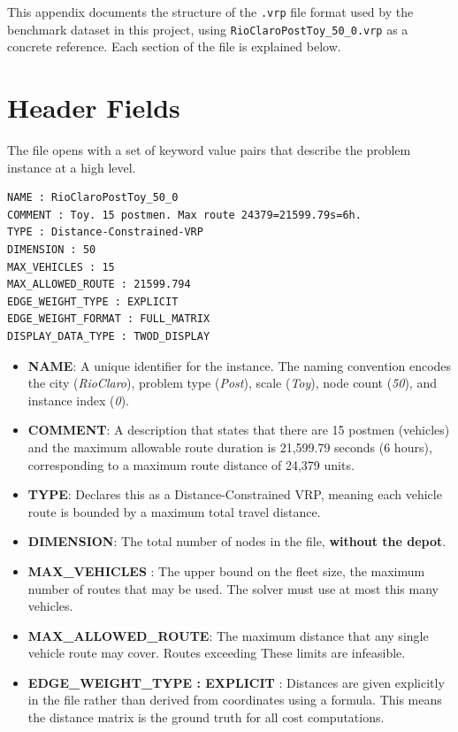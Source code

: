 \documentclass[a4paper]{report}
\begin{document}
{\begin{itemize}
\begin{itemize}
\begin{appendices}
This appendix documents the structure of the \texttt{.vrp} file format used by the
benchmark dataset in this project, using \texttt{RioClaroPostToy\_50\_0.vrp} as a
concrete reference. Each section of the file is explained below.
\section*{Header Fields}
The file opens with a set of keyword value pairs that describe the problem instance
at a high level.
\begin{verbatim}
NAME : RioClaroPostToy_50_0
COMMENT : Toy. 15 postmen. Max route 24379=21599.79s=6h.
TYPE : Distance-Constrained-VRP
DIMENSION : 50
MAX_VEHICLES : 15
MAX_ALLOWED_ROUTE : 21599.794
EDGE_WEIGHT_TYPE : EXPLICIT
EDGE_WEIGHT_FORMAT : FULL_MATRIX
DISPLAY_DATA_TYPE : TWOD_DISPLAY
\end{verbatim}
\begin{itemize}
    \item \textbf{NAME}: A unique identifier for the instance. The naming convention
    encodes the city (\textit{RioClaro}), problem type (\textit{Post}), scale
    (\textit{Toy}), node count (\textit{50}), and instance index (\textit{0}).

    \item \textbf{COMMENT}: A description that states that there are
    15 postmen (vehicles) and the maximum allowable route duration is 21,599.79
    seconds (6 hours), corresponding to a maximum route distance of 24,379 units.

    \item \textbf{TYPE}:  Declares this as a Distance-Constrained VRP, meaning each
    vehicle route is bounded by a maximum total travel distance.

    \item \textbf{DIMENSION}: The total number of nodes in the file, \textbf{without the depot}.
    \item \textbf{MAX\_VEHICLES} : The upper bound on the fleet size, the
    maximum number of routes that may be used. The solver must use at most this
    many vehicles.

    \item \textbf{MAX\_ALLOWED\_ROUTE}: The maximum distance that any single vehicle route may cover. Routes exceeding
    These limits are infeasible.

    \item \textbf{EDGE\_WEIGHT\_TYPE : EXPLICIT} : Distances are given explicitly in
    the file rather than derived from coordinates using a formula. This means the distance matrix is the ground truth for all cost
    computations.


\end{itemize}
\end{appendices}
\end{itemize}
\end{itemize}}
\end{document}
